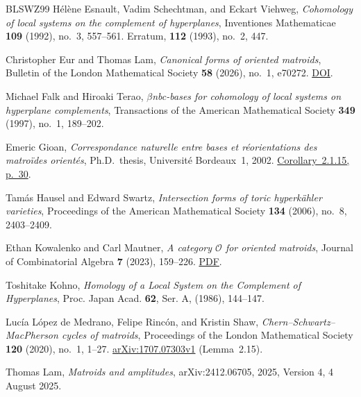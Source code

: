 \begin{thebibliography}{BLSWZ99}
H\'el\`ene Esnault, Vadim Schechtman, and Eckart Viehweg,
\emph{Cohomology of local systems on the complement of hyperplanes},
Inventiones Mathematicae \textbf{109} (1992), no.~3, 557--561.
Erratum, \textbf{112} (1993), no.~2, 447.

Christopher Eur and Thomas Lam, \emph{Canonical forms of oriented
matroids}, Bulletin of the London Mathematical Society \textbf{58}
(2026), no.~1, e70272.
\href{https://doi.org/10.1112/blms.70272}{DOI}.

Michael Falk and Hiroaki Terao, \emph{$\beta$nbc-bases for cohomology
of local systems on hyperplane complements}, Transactions of the
American Mathematical Society \textbf{349} (1997), no.~1, 189--202.

Emeric Gioan, \emph{Correspondance naturelle entre bases et
r\'eorientations des matro\"ides orient\'es}, Ph.D.\ thesis,
Universit\'e Bordeaux~1, 2002.
\href{https://www.lirmm.fr/~gioan/telecharger/2002%20Gioan%20-%20Correspondance%20naturelle%20entre%20bases%20et%20r%C3%A9orientations%20des%20matro%C3%AFdes%20orient%C3%A9s%20%5BThese%7D%20-%20Original%20sans%20erratum.pdf#page=66}{Corollary~2.1.15, p.~30}.

Tam\'as Hausel and Edward Swartz, \emph{Intersection forms of toric
hyperk\"ahler varieties}, Proceedings of the American Mathematical
Society \textbf{134} (2006), no.~8, 2403--2409.

Ethan Kowalenko and Carl Mautner, \emph{A category $\mathcal O$ for oriented
matroids}, Journal of Combinatorial Algebra \textbf{7} (2023), 159--226.
\href{https://ems.press/content/serial-article-files/37171}{PDF}.

Toshitake Kohno, \emph{Homology of a Local System on the Complement
of Hyperplanes}, Proc. Japan Acad. \textbf{62}, Ser. A, (1986), 144--147.

Luc\'ia L\'opez de Medrano, Felipe Rinc\'on, and Kristin Shaw,
\emph{Chern--Schwartz--MacPherson cycles of matroids}, Proceedings
of the London Mathematical Society \textbf{120} (2020), no.~1, 1--27.
\href{https://arxiv.org/pdf/1707.07303v1}{arXiv:1707.07303v1}
(Lemma~2.15).

Thomas Lam, \emph{Matroids and amplitudes}, arXiv:2412.06705, 2025,
  Version 4, 4 August 2025.


\end{thebibliography}
